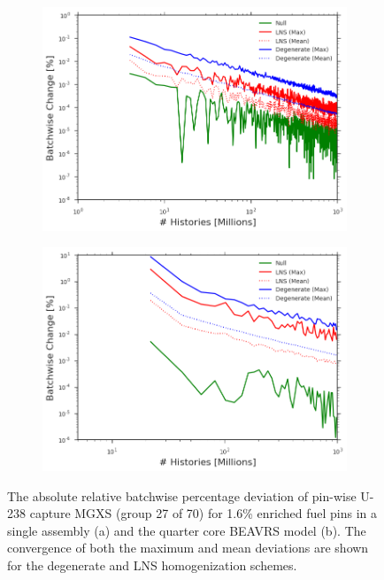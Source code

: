 \begin{figure}[h!]
\centering
\begin{subfigure}{.87\textwidth}
  \centering
  \includegraphics[width=\linewidth]{figures/patterns/convergence/assm-16/assm-16-dev-capture-27}
  \caption{}
  \label{fig:chap9-assm-16-dev-capt-27}
\end{subfigure}
\begin{subfigure}{.87\textwidth}
  \centering
  \includegraphics[width=\linewidth]{figures/patterns/convergence/full-core/16-enr-dev-capture-27}
  \caption{}
  \label{fig:chap9-full-core-dev-capt-27}
\end{subfigure}
\caption[Convergence of U-238 capture MGXS batchwise deviation]{The absolute relative batchwise percentage deviation of pin-wise U-238 capture \ac{MGXS} (group 27 of 70) for 1.6\% enriched fuel pins in a single assembly (a) and the quarter core \ac{BEAVRS} model (b). The convergence of both the maximum and mean deviations are shown for the degenerate and \ac{LNS} homogenization schemes.}
\label{fig:chap9-capt-27-dev}
\end{figure}

